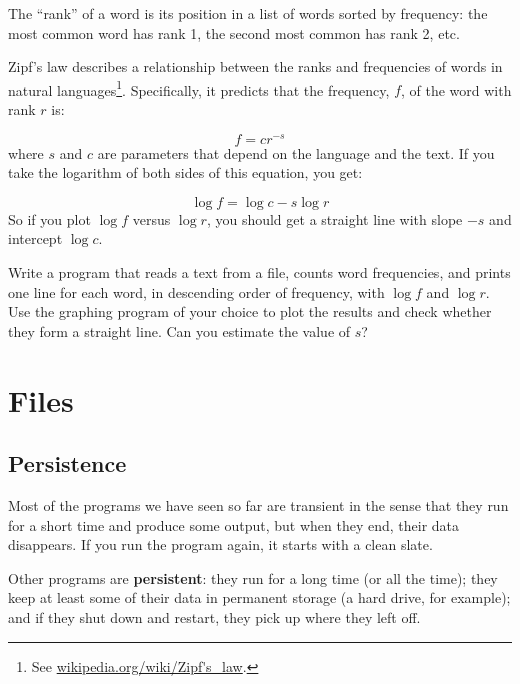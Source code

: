 \documentclass[10pt]{book}
\begin{document}
{\begin{ex}


The ``rank'' of a word is its position in a list of words
sorted by frequency: the most common word has rank 1, the
second most common has rank 2, etc.

Zipf's law describes a relationship between the ranks and frequencies
of words in natural languages\footnote{See
  \url{wikipedia.org/wiki/Zipf's_law}.}.  Specifically, it
predicts that the frequency, $f$, of the word with rank $r$ is:

\[ f = c r^{-s} \]
%
where $s$ and $c$ are parameters that depend on the language and the
text.  If you take the logarithm of both sides of this equation, you
get:


\[ \log f = \log c - s \log r \]
%
So if you plot $\log f$ versus $\log r$, you should get
a straight line with slope $-s$ and intercept $\log c$.

Write a program that reads a text from a file, counts
word frequencies, and prints one line
for each word, in descending order of frequency, with
$\log f$ and $\log r$.  Use the graphing program of your
choice to plot the results and check whether they form
a straight line.  Can you estimate the value of $s$?
\end{ex}


\chapter{Files}



\section{Persistence}


Most of the programs we have seen so far are transient in the
sense that they run for a short time and produce some output,
but when they end, their data disappears.  If you run the program
again, it starts with a clean slate.

Other programs are {\bf persistent}: they run for a long time
(or all the time); they keep at least some of their data
in permanent storage (a hard drive, for example); and
if they shut down and restart, they pick up where they left off.

}
\end{document}
